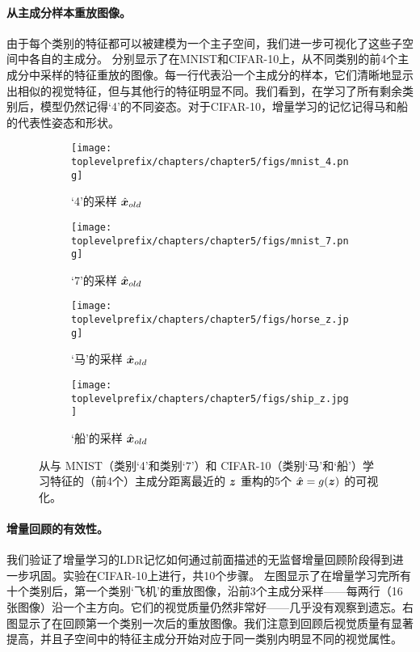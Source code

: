 \documentclass[../../book-main_zh.tex]{subfiles}
\begin{document}
\paragraph{从主成分样本重放图像。}
由于每个类别的特征都可以被建模为一个主子空间，我们进一步可视化了这些子空间中各自的主成分。  分别显示了在MNIST和CIFAR-10上，从不同类别的前4个主成分中采样的特征重放的图像。每一行代表沿一个主成分的样本，它们清晰地显示出相似的视觉特征，但与其他行的特征明显不同。我们看到，在学习了所有剩余类别后，模型仍然记得‘4’的不同姿态。对于CIFAR-10，增量学习的记忆记得马和船的代表性姿态和形状。

\begin{figure}[t]
    \begin{subfigure}[t]{0.20\textwidth}
        \centering
        \texttt{[image: \\toplevelprefix/chapters/chapter5/figs/mnist\_4.png]}
        \caption{‘4’的采样 $\hat{\bm{x}}_{old}$}
    \end{subfigure}
    \hfill
    \begin{subfigure}[t]{0.20\textwidth}
        \centering
        \texttt{[image: \\toplevelprefix/chapters/chapter5/figs/mnist\_7.png]}
        \caption{‘7’的采样 $\hat{\bm{x}}_{old}$}
    \end{subfigure}
    \hfill
    \begin{subfigure}[t]{0.20\textwidth}
        \centering
        \texttt{[image: \\toplevelprefix/chapters/chapter5/figs/horse\_z.jpg]}
        \caption{‘马’的采样 $\hat{\bm{x}}_{old}$}
    \end{subfigure}
    \hfill
    \begin{subfigure}[t]{0.20\textwidth}
        \centering
        \texttt{[image: \\toplevelprefix/chapters/chapter5/figs/ship\_z.jpg]}
        \caption{‘船’的采样 $\hat{\bm{x}}_{old}$}
    \end{subfigure}
    \caption{\small 从与 {MNIST}（类别‘4’和类别‘7’）和 {CIFAR-10}（类别‘马’和‘船’）学习特征的（前4个）主成分距离最近的 $\bm{z}$ 重构的5个 $\hat {\bm{x}}=g(\bm{z})$ 的可视化。}
    \label{fig:pca_sampling_main}
\end{figure}

\paragraph{增量回顾的有效性。}
我们验证了增量学习的LDR记忆如何通过前面描述的无监督增量回顾阶段得到进一步巩固。实验在CIFAR-10上进行，共10个步骤。  左图显示了在增量学习完所有十个类别后，第一个类别‘飞机’的重放图像，沿前3个主成分采样——每两行（16张图像）沿一个主方向。它们的视觉质量仍然非常好——几乎没有观察到遗忘。右图显示了在回顾第一个类别一次后的重放图像。我们注意到回顾后视觉质量有显著提高，并且子空间中的特征主成分开始对应于同一类别内明显不同的视觉属性。
\end{document}
